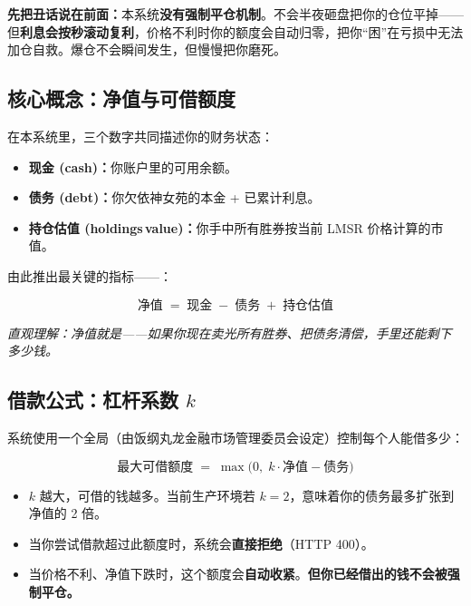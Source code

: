 \documentclass[11pt,a4paper,twoside]{article}
\begin{document}
\begin{notebox}
\textbf{先把丑话说在前面：}\;本系统\textbf{没有强制平仓机制}。\Marisa 不会半夜砸盘把你的仓位平掉——但\textbf{利息会按秒滚动复利}，价格不利时你的额度会自动归零，把你“困”在亏损中无法加仓自救。爆仓不会瞬间发生，但慢慢把你磨死。
\end{notebox}

\subsection{核心概念：净值与可借额度}

在本系统里，三个数字共同描述你的财务状态：

\begin{itemize}
  \item \textbf{现金 (cash)：}你账户里的可用余额。
  \item \textbf{债务 (debt)：}你欠依神女苑的本金 + 已累计利息。
  \item \textbf{持仓估值 (holdings\,value)：}你手中所有胜券按当前 LMSR 价格计算的市值。
\end{itemize}

由此推出最关键的指标——：

\begin{mathbox}
\[
  \text{净值} \;=\; \text{现金} \;-\; \text{债务} \;+\; \text{持仓估值}
\]
\end{mathbox}

\textit{直观理解：净值就是——如果你现在卖光所有胜券、把债务清偿，手里还能剩下多少钱。}

\subsection{借款公式：杠杆系数 \texorpdfstring{$k$}{k}}

系统使用一个全局（由饭纲丸龙金融市场管理委员会设定）控制每个人能借多少：

\begin{mathbox}
\[
  \text{最大可借额度} \;=\; \max\!\bigl(0,\; k \cdot \text{净值} - \text{债务}\bigr)
\]
\end{mathbox}

\begin{itemize}
  \item $k$ 越大，可借的钱越多。当前生产环境若 $k = 2$，意味着你的债务最多扩张到净值的 2 倍。
  \item 当你尝试借款超过此额度时，系统会\textbf{直接拒绝}（HTTP 400）。
  \item 当价格不利、净值下跌时，这个额度会\textbf{自动收紧}。\textbf{但你已经借出的钱不会被强制平仓。}
\end{itemize}
\end{document}
